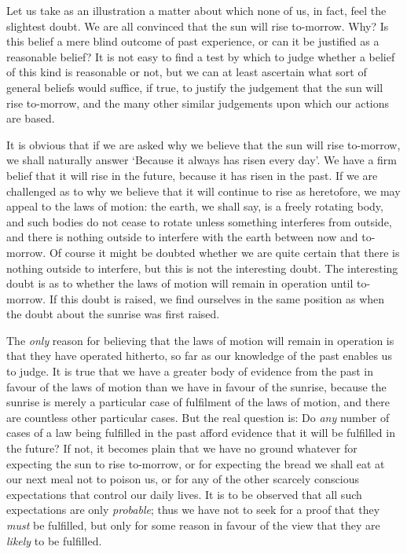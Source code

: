 \documentclass[oneside,letterpaper,12pt]{book}
\begin{document}
Let us take as an illustration a matter about which none of us, in fact,
feel the slightest doubt. \label{sun} We are all convinced that the sun will rise
to-morrow. Why? Is this belief a mere blind outcome of past experience,
or can it be justified as a reasonable belief? It is not easy to find a
test by which to judge whether a belief of this kind is reasonable or
not, but we can at least ascertain what sort of general beliefs would
suffice, if true, to justify the judgement that the sun will rise
to-morrow, and the many other similar judgements upon which our actions
are based.

It is obvious that if we are asked why we believe that the sun will rise
to-morrow, we shall naturally answer `Because it always
has risen every day'. We have a firm belief that it will
rise in the future, because it has risen in the past. If we are
challenged as to why we believe that it will continue to rise as
heretofore, we may appeal to the laws of motion: the earth, we shall
say, is a freely rotating body, and such bodies do not cease to rotate
unless something interferes from outside, and there is nothing outside
to interfere with the earth between now and to-morrow. Of course it
might be doubted whether we are quite certain that there is nothing
outside to interfere, but this is not the interesting doubt. The
interesting doubt is as to whether the laws of motion will remain in
operation until to-morrow. If this doubt is raised, we find ourselves in
the same position as when the doubt about the sunrise was first raised.

The \emph{only} reason for believing that the laws of motion will remain
in operation is that they have operated hitherto, so far as our
knowledge of the past enables us to judge. It is true that we have a
greater body of evidence from the past in favour of the laws of motion
than we have in favour of the sunrise, because the sunrise is merely a
particular case of fulfilment of the laws of motion, and there are
countless other particular cases. But the real question is: Do
\emph{any} number of cases of a law being fulfilled in the past afford
evidence that it will be fulfilled in the future? If not, it becomes
plain that we have no ground whatever for expecting the sun to rise
to-morrow, or for expecting the bread we shall eat at our next meal not
to poison us, or for any of the other scarcely conscious expectations
that control our daily lives. It is to be observed that all such
expectations are only \emph{probable}; thus we have not to seek for a
proof that they \emph{must} be fulfilled, but only for some reason in
favour of the view that they are \emph{likely} to be fulfilled.
\end{document}
